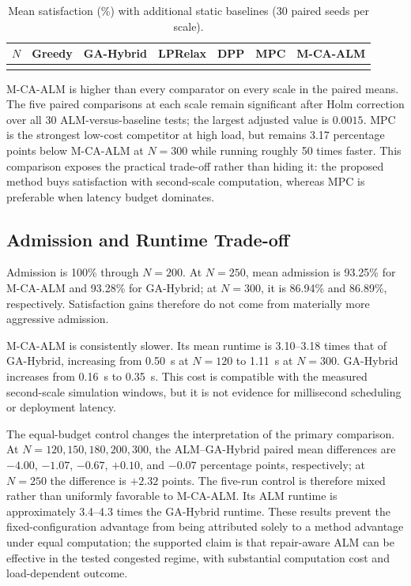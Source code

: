 \begin{table}[t]
\centering
\caption{Mean satisfaction (\%) with additional static baselines (30 paired seeds per scale).}
\label{tab:official_baselines}
\small
\begin{tabular}{rrrrrrr}
\toprule
$N$ & Greedy & GA-Hybrid & LPRelax & DPP & MPC & M-CA-ALM \\
\midrule
 \\
\bottomrule
\end{tabular}
\end{table}

M-CA-ALM is higher than every comparator on every scale in the paired means. The five paired comparisons at each scale remain significant after Holm correction over all 30 ALM-versus-baseline tests; the largest adjusted value is $0.0015$. MPC is the strongest low-cost competitor at high load, but remains 3.17 percentage points below M-CA-ALM at $N=300$ while running roughly 50 times faster. This comparison exposes the practical trade-off rather than hiding it: the proposed method buys satisfaction with second-scale computation, whereas MPC is preferable when latency budget dominates.

\subsection{Admission and Runtime Trade-off}
Admission is 100\% through $N=200$. At $N=250$, mean admission is 93.25\% for M-CA-ALM and 93.28\% for GA-Hybrid; at $N=300$, it is 86.94\% and 86.89\%, respectively. Satisfaction gains therefore do not come from materially more aggressive admission.

M-CA-ALM is consistently slower. Its mean runtime is 3.10--3.18 times that of GA-Hybrid, increasing from 0.50~s at $N=120$ to 1.11~s at $N=300$. GA-Hybrid increases from 0.16~s to 0.35~s. This cost is compatible with the measured second-scale simulation windows, but it is not evidence for millisecond scheduling or deployment latency.

The equal-budget control changes the interpretation of the primary comparison. At $N=120,150,180,200,300$, the ALM--GA-Hybrid paired mean differences are $-4.00$, $-1.07$, $-0.67$, $+0.10$, and $-0.07$ percentage points, respectively; at $N=250$ the difference is $+2.32$ points. The five-run control is therefore mixed rather than uniformly favorable to M-CA-ALM. Its ALM runtime is approximately 3.4--4.3 times the GA-Hybrid runtime. These results prevent the fixed-configuration advantage from being attributed solely to a method advantage under equal computation; the supported claim is that repair-aware ALM can be effective in the tested congested regime, with substantial computation cost and load-dependent outcome.


